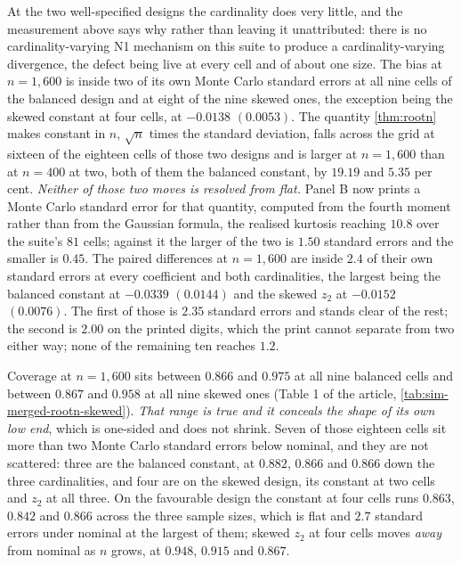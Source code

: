\documentclass[
  12pt]{article}
\newcommand{\1}[1]{\mathds{1}\left[#1\right]}
\theoremstyle{plain}
\theoremstyle{definition}
\theoremstyle{definition}
\theoremstyle{remark}
\begin{document}
At the two well-specified designs the cardinality does very little, and the
measurement above says why rather than leaving it unattributed: there is no
cardinality-varying N1 mechanism on this suite to produce a cardinality-varying
divergence, the defect being live at every cell and of about one size. The bias at
$n=1{,}600$ is inside two of its own Monte Carlo standard errors at all nine
cells of the balanced design and at eight of the nine skewed ones, the exception
being the skewed constant at four cells, at $-0.0138$ $(0.0053)$. The quantity
\cref{thm:rootn} makes constant in $n$, $\sqrt n$ times the standard deviation,
falls across the grid at sixteen of the eighteen cells of those two designs and
is larger at $n=1{,}600$ than at $n=400$ at two, both of them the balanced
constant, by $19.19$ and $5.35$ per cent. \emph{Neither of those two moves is resolved
from flat.} Panel B now prints a Monte Carlo standard error for that quantity,
computed from the fourth moment rather than from the Gaussian formula, the
realised kurtosis reaching $10.8$ over the suite's $81$ cells; against it the
larger of the two is $1.50$ standard errors and the smaller is $0.45$. The paired differences at $n=1{,}600$ are
inside $2.4$ of their own standard errors at every coefficient and both
cardinalities, the largest being the balanced constant at $-0.0339$ $(0.0144)$
and the skewed $z_2$ at $-0.0152$ $(0.0076)$. The first of those is $2.35$
standard errors and stands clear of the rest; the second is $2.00$ on the printed
digits, which the print cannot separate from two either way; none of the
remaining ten reaches $1.2$.

Coverage at $n=1{,}600$ sits between $0.866$ and $0.975$ at all nine balanced
cells and between $0.867$ and $0.958$ at all nine skewed ones
(Table 1 of the article, \cref{tab:sim-merged-rootn-skewed}).
\emph{That range is true and it conceals the shape of its own low end}, which is
one-sided and does not shrink. Seven of those eighteen cells sit more than two
Monte Carlo standard errors below nominal, and they are not scattered: three are
the balanced constant, at $0.882$, $0.866$ and $0.866$ down the three
cardinalities, and four are on the skewed design, its constant at two cells and
$z_2$ at all three. On the favourable design the constant at four cells runs
$0.863$, $0.842$ and $0.866$ across the three sample sizes, which is flat and
$2.7$ standard errors under nominal at the largest of them; skewed $z_2$ at four
cells moves \emph{away} from nominal as $n$ grows, at $0.948$, $0.915$ and $0.867$.
\end{document}
